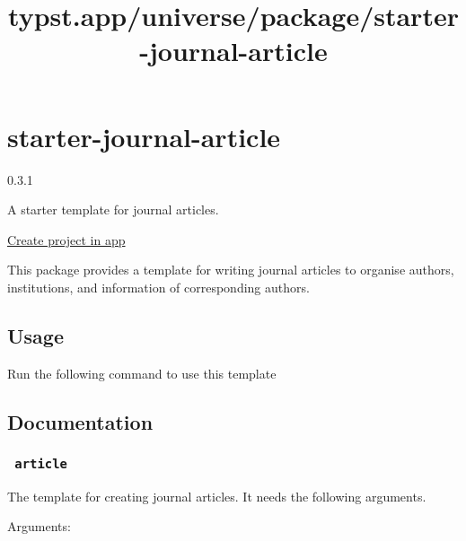 \title{typst.app/universe/package/starter-journal-article}

\label{banner}
\label{template-thumbnail}

\section{starter-journal-article}\label{starter-journal-article}

{ 0.3.1 }

A starter template for journal articles.

\href{/app?template=starter-journal-article&version=0.3.1}{Create
project in app}

\label{readme}
This package provides a template for writing journal articles to
organise authors, institutions, and information of corresponding
authors.

\subsection{Usage}\label{usage}

Run the following command to use this template

\begin{Shaded}
\begin{Highlighting}[]
\end{Highlighting}
\end{Shaded}

\subsection{Documentation}\label{documentation}

\subsubsection{\texorpdfstring{\texttt{\ article\ }}{ article }}\label{article}

The template for creating journal articles. It needs the following
arguments.

Arguments:

